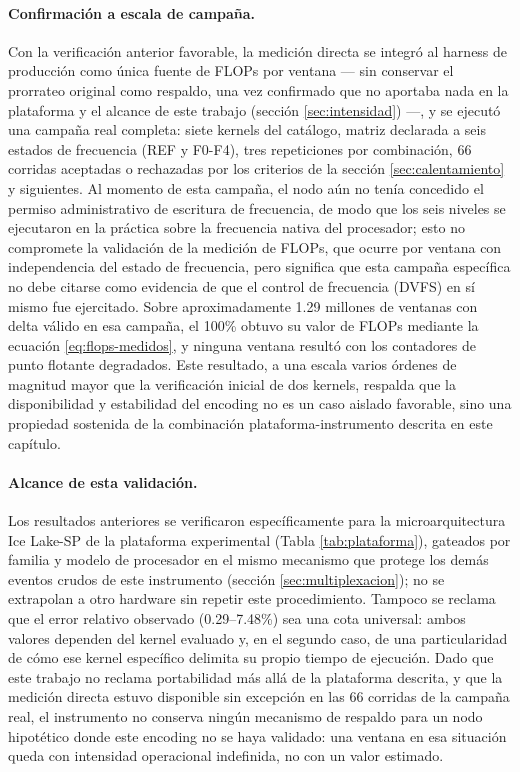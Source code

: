 \documentclass[12pt,oneside,spanish]{book}
\begin{document}
\paragraph{Confirmación a escala de campaña.} Con la verificación anterior favorable, la medición directa se integró al harness de producción como única fuente de FLOPs por ventana --- sin conservar el prorrateo original como respaldo, una vez confirmado que no aportaba nada en la plataforma y el alcance de este trabajo (sección \ref{sec:intensidad}) ---, y se ejecutó una campaña real completa: siete kernels del catálogo, matriz declarada a seis estados de frecuencia (REF y F0-F4), tres repeticiones por combinación, 66 corridas aceptadas o rechazadas por los criterios de la sección \ref{sec:calentamiento} y siguientes. Al momento de esta campaña, el nodo aún no tenía concedido el permiso administrativo de escritura de frecuencia, de modo que los seis niveles se ejecutaron en la práctica sobre la frecuencia nativa del procesador; esto no compromete la validación de la medición de FLOPs, que ocurre por ventana con independencia del estado de frecuencia, pero significa que esta campaña específica no debe citarse como evidencia de que el control de frecuencia (DVFS) en sí mismo fue ejercitado. Sobre aproximadamente 1.29 millones de ventanas con delta válido en esa campaña, el 100\% obtuvo su valor de FLOPs mediante la ecuación \eqref{eq:flops-medidos}, y ninguna ventana resultó con los contadores de punto flotante degradados. Este resultado, a una escala varios órdenes de magnitud mayor que la verificación inicial de dos kernels, respalda que la disponibilidad y estabilidad del encoding no es un caso aislado favorable, sino una propiedad sostenida de la combinación plataforma-instrumento descrita en este capítulo.

\paragraph{Alcance de esta validación.} Los resultados anteriores se verificaron específicamente para la microarquitectura Ice Lake-SP de la plataforma experimental (Tabla \ref{tab:plataforma}), gateados por familia y modelo de procesador en el mismo mecanismo que protege los demás eventos crudos de este instrumento (sección \ref{sec:multiplexacion}); no se extrapolan a otro hardware sin repetir este procedimiento. Tampoco se reclama que el error relativo observado (0.29--7.48\%) sea una cota universal: ambos valores dependen del kernel evaluado y, en el segundo caso, de una particularidad de cómo ese kernel específico delimita su propio tiempo de ejecución. Dado que este trabajo no reclama portabilidad más allá de la plataforma descrita, y que la medición directa estuvo disponible sin excepción en las 66 corridas de la campaña real, el instrumento no conserva ningún mecanismo de respaldo para un nodo hipotético donde este encoding no se haya validado: una ventana en esa situación queda con intensidad operacional indefinida, no con un valor estimado.
\end{document}
